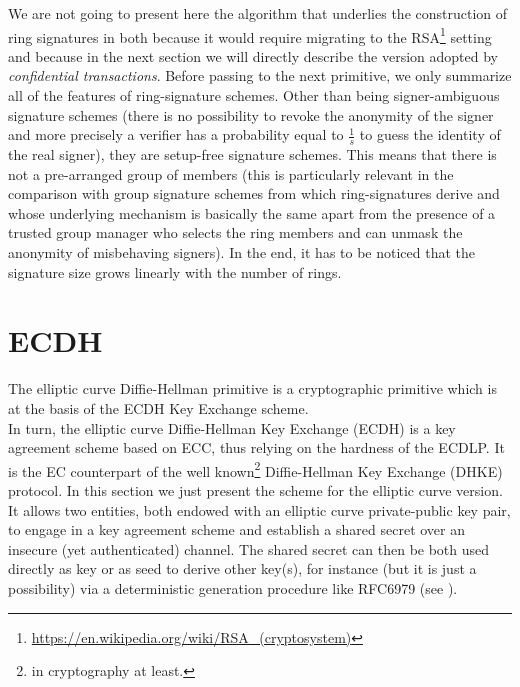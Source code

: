 We are not going to present here the algorithm that underlies the construction of ring signatures in \cite{LeakSecret} both because it would require migrating to the RSA\footnote{\url{https://en.wikipedia.org/wiki/RSA_(cryptosystem)}} setting and because in the next section we will directly describe the version adopted by \textit{confidential transactions}. Before passing to the next primitive, we only summarize all of the features of ring-signature schemes. Other than being signer-ambiguous signature schemes (there is no possibility to revoke the anonymity of the signer and more precisely a verifier has a probability equal to $\frac{1}{s}$ to guess the identity of the real signer), they are setup-free signature schemes. This means that there is not a pre-arranged group of members (this is particularly relevant in the comparison with group signature schemes from which ring-signatures derive and whose underlying mechanism is basically the same apart from the presence of a trusted group manager who selects the ring members and can unmask the anonymity of misbehaving signers). In the end, it has to be noticed that the signature size grows linearly with the number of rings.

\section{ECDH}
The elliptic curve Diffie-Hellman primitive is a cryptographic primitive which is at the basis of the ECDH Key Exchange scheme.\\
In turn, the elliptic curve Diffie-Hellman Key Exchange (ECDH) is a key agreement scheme based on ECC, thus relying on the hardness of the ECDLP. It is the EC counterpart of the well known\footnote{in cryptography at least.} Diffie-Hellman Key Exchange (DHKE) protocol. In this section we just present the scheme for the elliptic curve version.\\
It allows two entities, both endowed with an elliptic curve private-public key pair, to engage in a key agreement scheme and establish a shared secret over an insecure (yet authenticated) channel. The shared secret can then be both used directly as key or as seed to derive other key(s), for instance (but it is just a possibility) via a deterministic generation procedure like RFC6979 (see \cite{rfc6979}).
